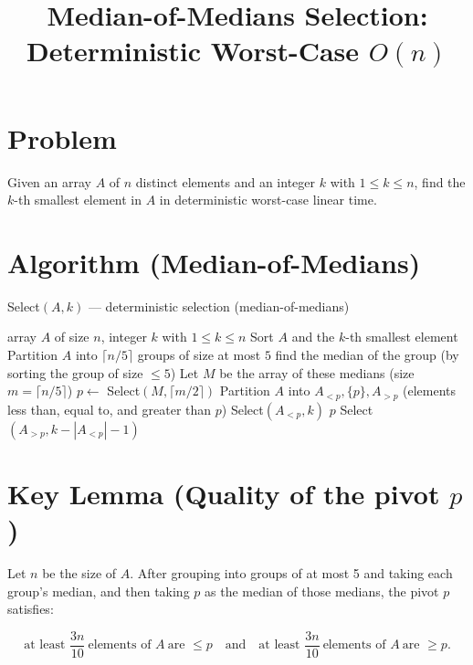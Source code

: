 \documentclass[11pt]{article}
\begin{document}
\title{Median-of-Medians Selection: Deterministic Worst-Case \(O(n)\)}
\author{}
\date{}
\maketitle

\section*{Problem}
Given an array \(A\) of \(n\) distinct elements and an integer \(k\) with \(1 \le k \le n\), find the \(k\)-th smallest element in \(A\) in deterministic worst-case linear time.

\section*{Algorithm (Median-of-Medians)}
\begin{algorithm}
\caption{Select$(A,k)$ — deterministic selection (median-of-medians)}
\begin{algorithmic}[1]
\Require array $A$ of size $n$, integer $k$ with $1\le k\le n$
  \State Sort $A$ and \Return the $k$-th smallest element
\EndIf
\State Partition $A$ into $\lceil n/5\rceil$ groups of size at most $5$
  \State find the median of the group (by sorting the group of size $\le 5$)
\EndFor
\State Let $M$ be the array of these medians (size $m=\lceil n/5\rceil$)
\State $p \gets$ Select$(M,\lceil m/2\rceil)$ 
\State Partition $A$ into $A_{<p}, \{p\}, A_{>p}$ (elements less than, equal to, and greater than $p$)
  \State \Return Select$(A_{<p},k)$
  \State \Return $p$
\Else
  \State \Return Select$(A_{>p}, k-|A_{<p}|-1)$
\EndIf
\end{algorithmic}
\end{algorithm}

\section*{Key Lemma (Quality of the pivot \(p\))}
Let \(n\) be the size of \(A\). After grouping into groups of at most 5 and taking each group's median, and then taking \(p\) as the median of those medians, the pivot \(p\) satisfies:

\[
\text{at least } \frac{3n}{10}\ \text{elements of }A\ \text{are } \le p
\quad\text{and}\quad
\text{at least } \frac{3n}{10}\ \text{elements of }A\ \text{are } \ge p.
\]
\end{document}
